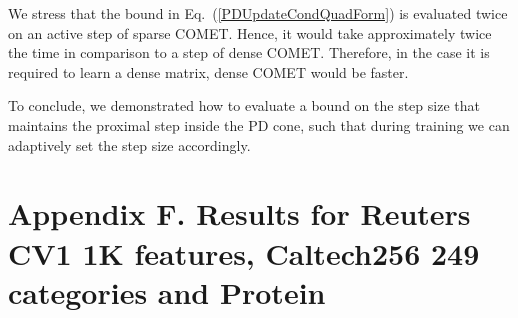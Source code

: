 \documentclass[twoside,11pt]{article}
\newcommand\mat[1]{{#1}}
\newcommand{\W}{\mat{W}}
\newcommand{\Hk}{H_k}
\newcommand{\Vk}{\mat{V_k}}
\renewcommand{\eqref}[1]{Eq.~(\ref{#1})}
\begin{document}

We stress that the bound in \eqref{PDUpdateCondQuadForm} is evaluated twice on an active step of sparse COMET. Hence, it would take approximately twice the time in comparison to a step of dense COMET. Therefore, in the case it is required to learn a dense matrix, dense COMET would be faster.

To conclude, we demonstrated how to evaluate a bound on the step size that maintains the proximal step inside the PD cone, such that during training we can adaptively set the step size accordingly.

\section*{Appendix F. Results for Reuters CV1 1K features, Caltech256 249 categories and Protein}
\end{document}
